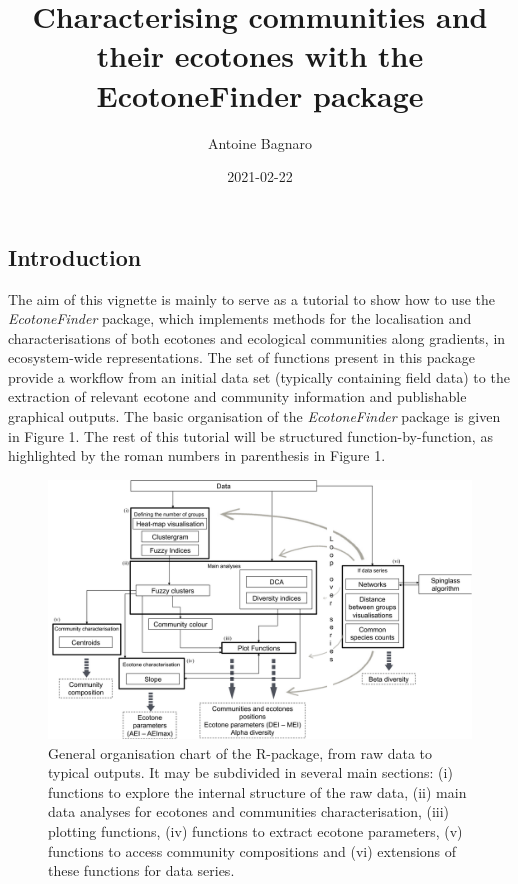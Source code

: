 \documentclass[
]{article}
\title{Characterising communities and their ecotones with the
EcotoneFinder package}
\author{Antoine Bagnaro}
\date{2021-02-22}
\begin{document}
\maketitle

{
\setcounter{tocdepth}{2}
\tableofcontents
}
\hypertarget{introduction}{%
\subsection{Introduction}\label{introduction}}

The aim of this vignette is mainly to serve as a tutorial to show how to
use the \emph{EcotoneFinder} package, which implements methods for the
localisation and characterisations of both ecotones and ecological
communities along gradients, in ecosystem-wide representations. The set
of functions present in this package provide a workflow from an initial
data set (typically containing field data) to the extraction of relevant
ecotone and community information and publishable graphical outputs. The
basic organisation of the \emph{EcotoneFinder} package is given in
Figure 1. The rest of this tutorial will be structured
function-by-function, as highlighted by the roman numbers in parenthesis
in Figure 1.

\begin{figure}

{\centering \includegraphics[width=0.85\linewidth]{AnalysesDiagram} 

}

\caption{General organisation chart of the R-package, from raw data to typical outputs. It may be subdivided in several main sections: (i) functions to explore the internal structure of the raw data, (ii) main data analyses for ecotones and communities characterisation, (iii) plotting functions, (iv) functions to extract ecotone parameters, (v) functions to access community compositions and (vi) extensions of these functions for data series.}\label{fig:unnamed-chunk-2}
\end{figure}
\end{document}
